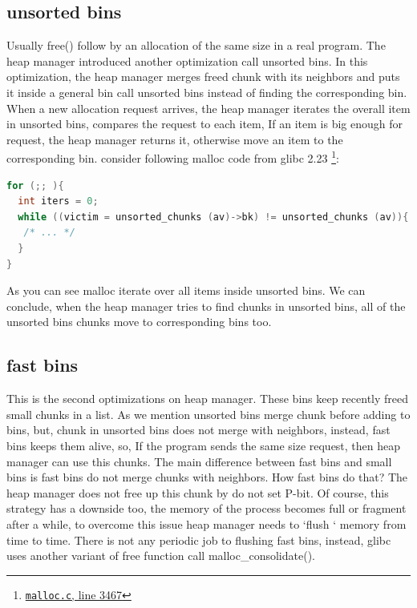 \documentclass{masterthesis}
\newcommand*\libc{glibc}
\newcommand*\fb{fast bins}
\newcommand*\ub{unsorted bins}
\newcommand*\sbs{small bins}
\begin{document}
\subsection{\ub{}}
Usually free() follow by an allocation of the same size in a real program. The heap manager introduced another optimization call \ub{}. In this optimization, the heap manager merges freed chunk with its neighbors and puts it inside a general bin call \ub{} instead of finding the corresponding bin. When a new allocation request arrives, the heap manager iterates the overall item in \ub{}, compares the request to each item, If an item is big enough for request, the heap manager returns it, otherwise move an item to the corresponding bin. consider following malloc code from \libc{} 2.23 \footnote{\href{https://sourceware.org/git/?p=glibc.git;a=blob;f=malloc/malloc.c;hb=ad372e296b6b944884f14fb5d8f3a6195bfba22b\#l3467}{\texttt{malloc.c}, line 3467}}:

\begin{lstlisting}[language=c,frame=tlrb]
for (;; ){
  int iters = 0;
  while ((victim = unsorted_chunks (av)->bk) != unsorted_chunks (av)){
   /* ... */ 
  }
}
\end{lstlisting}

As you can see malloc iterate over all items inside \ub{}. We can conclude, when the heap manager tries to find chunks in \ub{}, all of the \ub{} chunks move to corresponding bins too.

\subsection{\fb{}}
This is the second optimizations on heap manager. These bins keep recently freed small chunks in a list. As we mention \ub{} merge chunk before adding to bins, but, chunk in \ub{} does not merge with neighbors, instead, \fb{} keeps them alive, so, If the program sends the same size request, then heap manager can use this chunks.
The main difference between \fb{} and \sbs{} is \fb{} do not merge chunks with neighbors. How \fb{} do that? The heap manager does not free up this chunk by do not set P-bit. Of course, this strategy has a downside too, the memory of the process becomes full or fragment after a while, to overcome this issue heap manager needs to ‘flush ‘ memory from time to time. There is not any periodic job to flushing \fb{}, instead, \libc{} uses another variant of free function call malloc\_consolidate(). 
\end{document}
